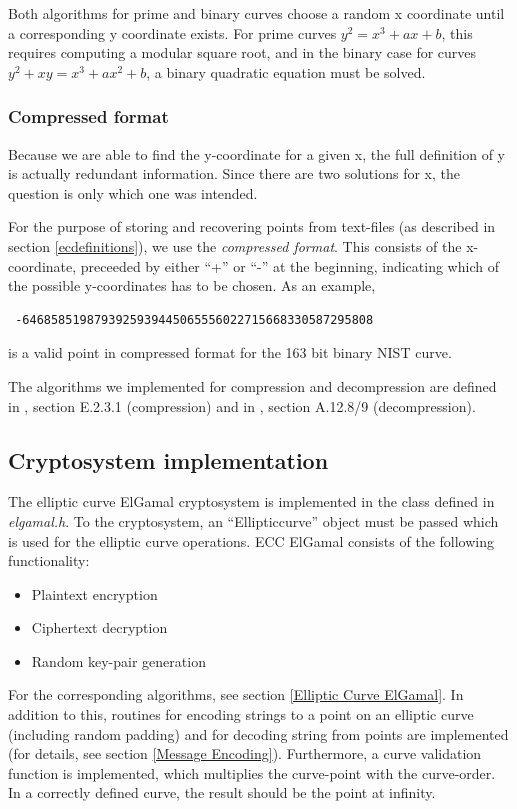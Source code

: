 \documentclass[11pt,english]{article}
\begin{document}
Both algorithms for prime and binary curves choose a random x coordinate until a corresponding y coordinate exists. For prime curves $y^2=x^3+ax+b$, this requires computing a modular square root, and in the binary case for curves $y^2+xy=x^3+ax^2+b$, a binary quadratic equation must be solved.

\subsubsection{Compressed format}
\label{Compressed format}
Because we are able to find the y-coordinate for a given x, the full definition of y is actually redundant information. Since there are two solutions for x, the question is only which one was intended.

For the purpose of storing and recovering points from text-files (as described in section \ref{ecdefinitions}), we use the \emph{compressed format}. This consists of the x-coordinate, preceeded by either ``+'' or ``-'' at the beginning, indicating which of the possible y-coordinates has to be chosen. As an example,
\begin{verbatim}
 -6468585198793925939445065556022715668330587295808
\end{verbatim}
is a valid point in compressed format for the 163 bit binary NIST curve.

The algorithms we implemented for compression and decompression are defined in \cite{point-compress}, section E.2.3.1 (compression) and in \cite{point-decompress}, section A.12.8/9 (decompression).

\subsection{Cryptosystem implementation}
The elliptic curve ElGamal cryptosystem is implemented in the class defined in \emph{elgamal.h}. To the cryptosystem, an ``Ellipticcurve'' object must be passed which is used for the elliptic curve operations. ECC ElGamal consists of the following functionality:

\begin{itemize}
 \item Plaintext encryption
 \item Ciphertext decryption
 \item Random key-pair generation
\end{itemize}

For the corresponding algorithms, see section \ref{Elliptic Curve ElGamal}. In addition to this, routines for encoding strings to a point on an elliptic curve (including random padding) and for decoding string from points are implemented (for details, see section \ref{Message Encoding}). Furthermore, a curve validation function is implemented, which multiplies the curve-point with the curve-order. In a correctly defined curve, the result should be the point at infinity.
\end{document}
